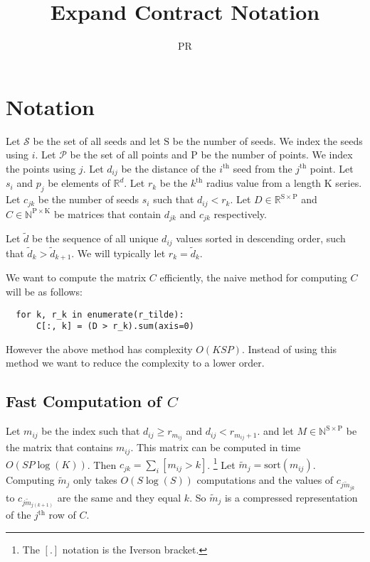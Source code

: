 \documentclass[14pt]{article}
\title{Expand Contract Notation}
\author{PR}
\renewcommand{\th}[1]{$#1^{\textrm{th}}$}
\newcommand{\td}[0]{\tilde{d}}
\begin{document}
\maketitle

\section{Notation}
\label{sec:notation}


Let $\mathcal{S}$ be the set of all seeds and let $\mathrm{S}$ be the
number of seeds. We index the seeds using $i$. Let $\mathcal{P}$ be the
set of all points and $\mathrm{P}$ be the number of points. We index the
points using $j$. Let $d_{ij}$ be the distance of the \th{i} seed from the
\th{j} point. Let $s_i$ and $p_j$ be elements of $\mathbb{R}^d$.
Let $r_k$ be the \th{k} radius value from a length $\mathrm{K}$ series.
Let $c_{jk}$ be the number of seeds $s_i$ such that $d_{ij} < r_k$.
Let $D \in \mathbb{R}^{\mathrm{S} \times \mathrm{P}}$ and
$C \in \mathbb{N}^{\mathrm{P} \times \mathrm{K}}$ be matrices that contain $d_{jk}$
and $c_{jk}$ respectively.

Let $\td$ be the sequence of all unique $d_{ij}$ values sorted in descending order,
such that $\td_{k} > \td_{k+1}$. We will typically let $r_k = \td_{k}$.

We want to compute the matrix $C$ efficiently, the naive method for computing $C$ will
be as follows:
\begin{lstlisting}
  for k, r_k in enumerate(r_tilde):
      C[:, k] = (D > r_k).sum(axis=0)
\end{lstlisting}
However the above method has complexity $O(KSP)$.
Instead of using this method we want to reduce the complexity to a lower order.
\subsection{Fast Computation of $C$}
\label{ssec:fast}
Let $m_{ij}$ be the index such that $d_{ij} \ge r_{m_{ij}}$ and $d_{ij} < r_{m_{ij} + 1}$.
and let $M \in \mathbb{N}^{\mathrm{S} \times \mathrm{P}}$ be the matrix that contains
$m_{ij}$. This matrix can be computed in time $O(SP\log(K))$.
Then $c_{jk} = \sum_i {[m_{ij} > k]}$.
\footnote{The $[.]$ notation is the Iverson bracket.}
Let $\tilde{m}_j = \textrm{sort}(m_{ij})$. Computing $\tilde{m}_j$ only takes
$O(S\log(S))$ computations and the values of $c_{j\tilde{m}_{jk}}$ to $c_{j\tilde{m}_{j{(k+1)}}}$ are the same and they equal $k$. So $\tilde{m}_j$ is a compressed representation
of the \th{j} row of $C$.









\end{document}

